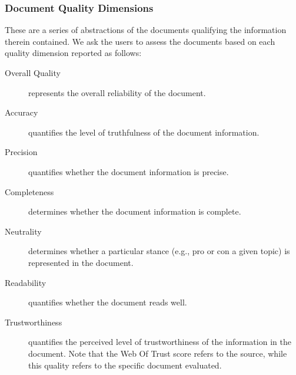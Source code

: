 \documentclass{llncs}
\begin{document}
\subsubsection{Document Quality Dimensions} These are a series of abstractions of the documents qualifying the information therein contained. We ask the users to assess the documents based on each quality dimension reported as follows:
\begin{description}
\item[Overall Quality] represents the overall reliability of the document.
%
%
%
\item[Accuracy] quantifies the level of truthfulness of the document information.
\item[Precision] quantifies whether the document information is precise.
\item[Completeness] determines whether the document information is complete.
\item[Neutrality] determines whether a particular stance (e.g., pro or con a given topic) is represented in the document.
\item[Readability] quantifies whether the document reads well.
\item[Trustworthiness] quantifies the perceived level of trustworthiness of the information in the document. Note that the Web Of Trust score refers to the source, while this quality refers to the specific document evaluated.
%
%
%
\end{description}
\end{document}
